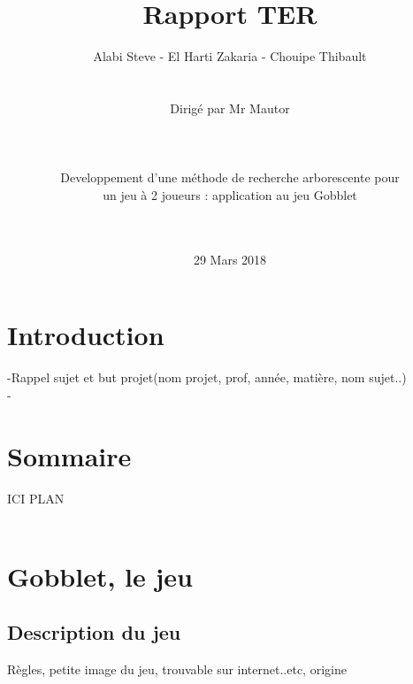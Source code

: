 \documentclass[a4]{article}
\begin{document}
	\title{\Huge{\textbf{Rapport TER}}}
	\author{Alabi Steve - El Harti Zakaria - Chouipe Thibault \\ \\ \\ 
		Dirigé par Mr Mautor \\ \\ \\ \\
		Developpement d’une méthode de recherche arborescente pour \\ un jeu à 2 joueurs : application au 
jeu Gobblet	\\ \\ \\}
	\date{29 Mars 2018}
		

	\begin{titlepage}
		\maketitle
		\vspace{20em}
	\end{titlepage}
	
	\section{Introduction}
	
	-Rappel sujet et but projet(nom projet, prof, année, matière, nom sujet..) \\
	- \\
	
	
	
	
	\section{Sommaire}
	
	ICI PLAN \\ \\
	
	
	
	
	
	\section{Gobblet, le jeu}
		\subsection{Description du jeu}
				Règles, petite image du jeu, trouvable sur internet..etc, origine\\ \\
	
\end{document}
